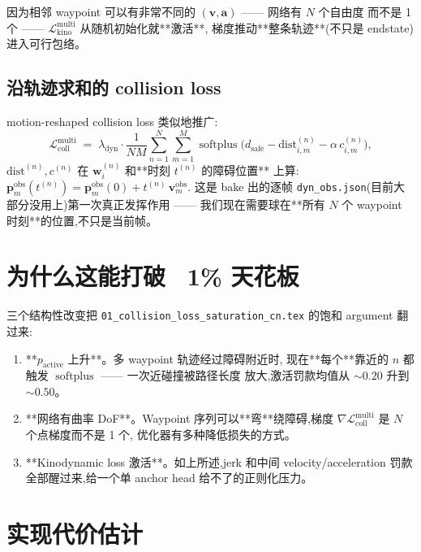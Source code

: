 \documentclass[UTF8, 11pt]{ctexart}
\newcommand{\softplus}{\operatorname{softplus}}
\begin{document}
因为相邻 waypoint 可以有非常不同的 $(\bm{v}, \bm{a})$ —— 网络有 $N$ 个自由度
而不是 1 个 —— $\mathcal{L}_{\text{kino}}^{\text{multi}}$ 从随机初始化就**激活**,
梯度推动**整条轨迹**(不只是 endstate)进入可行包络。

\subsection{沿轨迹求和的 collision loss}

motion-reshaped collision loss 类似地推广:
\begin{equation}\label{eq:coll-multi}
\mathcal{L}_{\text{coll}}^{\text{multi}}
\;=\;
\lambda_{\text{dyn}}
\cdot
\frac{1}{N M} \!\sum_{n=1}^{N} \sum_{m=1}^{M}
\softplus\!\bigl(d_{\text{safe}} - \mathrm{dist}_{i,m}^{(n)} -\alpha\, c_{i,m}^{(n)}\bigr),
\end{equation}
$\mathrm{dist}^{(n)}, c^{(n)}$ 在 $\bm{w}_i^{(n)}$ 和**时刻 $t^{(n)}$ 的障碍位置**
上算:
\(
\bm{p}_m^{\text{obs}}(t^{(n)}) = \bm{p}_m^{\text{obs}}(0) + t^{(n)}\,\bm{v}_m^{\text{obs}}.
\)
这是 bake 出的逐帧 \texttt{dyn\_obs.json}(目前大部分没用上)第一次真正发挥作用
—— 我们现在需要球在**所有 $N$ 个 waypoint 时刻**的位置,不只是当前帧。

\section{为什么这能打破 ~1\% 天花板}

三个结构性改变把
\texttt{01\_collision\_loss\_saturation\_cn.tex} 的饱和 argument 翻过来:

\begin{enumerate}
  \item **$p_{\text{active}}$ 上升**。多 waypoint 轨迹经过障碍附近时,
        现在**每个**靠近的 $n$ 都触发 $\softplus$ —— 一次近碰撞被路径长度
        放大,激活罚款均值从 $\sim$$0.20$ 升到 $\sim$$0.50$。
  \item **网络有曲率 DoF**。Waypoint 序列可以**弯**绕障碍,梯度
        $\nabla \mathcal{L}_{\text{coll}}^{\text{multi}}$ 是 $N$ 个点梯度而不是 1 个,
        优化器有多种降低损失的方式。
  \item **Kinodynamic loss 激活**。如上所述,jerk 和中间 velocity/acceleration
        罚款全部醒过来,给一个单 anchor head 给不了的正则化压力。
  \end{enumerate}

\section{实现代价估计}
\end{document}
